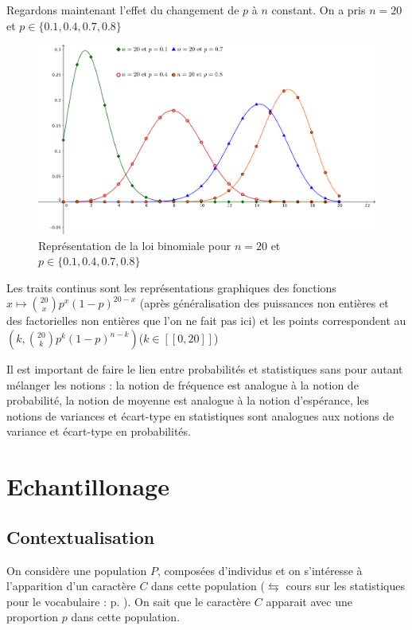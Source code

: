 Regardons maintenant l'effet du changement de $p$ à $n$ constant. On a pris $n = 20$ et $p \in \{0.1,0.4,0.7,0.8\}$
\begin{figure}[H]
\centering
\includegraphics[scale=0.7]{images/loi_binomiale_2.png}
\caption{Représentation de la loi binomiale pour $n = 20$ et $p \in \{0.1,0.4,0.7,0.8\}$}
\end{figure}
Les traits continus sont les représentations graphiques des fonctions $x\mapsto \binom{20}{x} p^x (1-p)^{20-x}$ (après généralisation des puissances non entières et des factorielles non entières que l'on ne fait pas ici) et les points correspondent au $(k,\binom{20}{k} p^k (1-p)^{n-k})$($k\in [\![0,20]\!]$)\newline


Il est important de faire le lien entre probabilités et statistiques sans pour autant mélanger les notions : la notion de fréquence est analogue à la notion de probabilité, la notion de moyenne est analogue à la notion d'espérance, les notions de variances et écart-type en statistiques sont analogues aux notions de variance et écart-type en probabilités.
\chapter{Echantillonage}
\section{Contextualisation}
On considère une population $P$, composées d'individus et on s'intéresse à l'apparition d'un caractère $C$ dans cette population ($\leftrightarrows$ cours sur les statistiques pour le vocabulaire : p. \pageref{chap:stats}). On sait que le caractère $C$ apparait avec une proportion $p$ dans cette population.\newline

